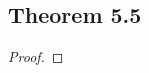 \documentclass[../../main.tex]{subfiles}
\begin{document}
\subsection{Theorem 5.5}
\begin{wts}

\end{wts}
\begin{proof}

\end{proof}
\end{document}
